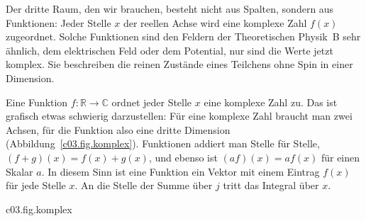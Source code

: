 Der dritte Raum, den wir brauchen, besteht nicht aus Spalten, sondern aus Funktionen: Jeder
Stelle $x$ der reellen Achse wird eine komplexe Zahl $f(x)$ zugeordnet. Solche Funktionen
sind den Feldern der Theoretischen Physik~B sehr ähnlich, dem elektrischen Feld oder dem
Potential, nur sind die Werte jetzt komplex. Sie beschreiben die reinen Zustände eines
Teilchens ohne Spin in einer Dimension.

\begin{vertiefung}[id=c03.v2,
    titel={Funktionen als Vektoren},
    wozu={Funktionen lassen sich addieren und mit Zahlen multiplizieren wie Vektoren. Hier
      bekommen sie ein Skalarprodukt, mit einem Integral an der Stelle der Summe (mit einem
      Vorbehalt, der im Fundament aufgelöst wird), und dieselbe Zulassungsbedingung wie die
      Spalten in $\elltwo$.},
    voraussetzung={Abschnitt~\ref{c03.s2}; uneigentliche Integrale. Vertiefung~\ref{c03.v1}
      hilft, ist aber nicht nötig. Der Kern bis Kapitel~4 braucht den Block nicht;
      Kapitel~5 führt den Raum im Kern noch einmal ein.},
    zurueck={Quadratintegrierbare Funktionen bilden einen Vektorraum, auf dem das Integral
      $\braket{f}{g} = \int f^*(x)\, g(x)\, \dd x$ erklärt ist; ein echtes Skalarprodukt wird
      es erst, wenn man Funktionen identifiziert, die fast überall übereinstimmen. Die konstante
      Funktion $1$ gehört nicht dazu.}]
  Eine Funktion $f\colon \mathbb{R} \to \mathbb{C}$ ordnet jeder Stelle $x$ eine komplexe
  Zahl zu. Das ist grafisch etwas schwierig darzustellen: Für eine komplexe Zahl braucht man
  zwei Achsen, für die Funktion also eine dritte Dimension
  (Abbildung~\ref{c03.fig.komplex}). Funktionen addiert man Stelle für Stelle,
  $(f + g)(x) = f(x) + g(x)$, und ebenso ist $(af)(x) = a f(x)$ für einen Skalar $a$. In
  diesem Sinn ist eine Funktion ein Vektor mit einem Eintrag $f(x)$ für jede Stelle $x$. An
  die Stelle der Summe über $j$ tritt das Integral über $x$.

  \begin{tpcfigure}{c03.fig.komplex}
    \caption{Eine komplexwertige Funktion braucht drei Dimensionen. Gezeichnet ist
      $f(x) = e^{-x^2/2}\, e^{2ix}$ für $-3 \leq x \leq 3$: Zu jedem $x$ gehört der Punkt
      $(\operatorname{Re} f(x), \operatorname{Im} f(x))$ einer komplexen Ebene, die senkrecht
      auf der $x$-Achse steht. Die Kurve windet sich um die $x$-Achse; ihr Abstand von der
      Achse ist $\abs{f(x)} = e^{-x^2/2}$ (dünne Kreise bei $x = -1, 0, 1$; dünne Speichen verbinden die Achse mit der Kurve). Gestrichelt ist der Realteil
      allein, in der Ebene $\operatorname{Im} f = 0$: die gewohnte Zeichnung, der die
      Hälfte der Information fehlt.}
  \end{tpcfigure}


\end{vertiefung}
